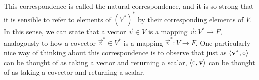 \documentclass[../main.tex]{subfiles}
\begin{document}
    This correspondence is called the natural correspondence, and it is so strong that it is sensible to refer to elements of \((V^{*})^{*}\) by their corresponding elements of \(V\). In this sense, we can state that a vector \(\vec{v}\in{}V\) is a mapping \(\vec{v}:V^{*}\to{}F\), analogously to how a covector \(\vec{v}^{*}\in{}V^{*}\) is a mapping \(\vec{v}^{*}:V\to{}F\). One particularly nice way of thinking about this correspondence is to observe that just as \(\langle\mathbf{v}^{*},\circ\rangle\) can be thought of as taking a vector and returning a scalar, \(\langle\circ,\mathbf{v}\rangle\) can be thought of as taking a covector and returning a scalar.
\end{document}
